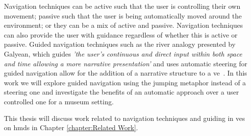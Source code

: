 Navigation techniques can be active such that the user is controlling their own movement; passive such that the user is being automatically moved around the environment; or they can be a mix of active and passive. Navigation techniques can also provide the user with guidance regardless of whether this is active or passive. Guided navigation techniques such as the river analogy presented by Galyean, which guides \textit{'the user’s continuous and direct input within both space and time allowing a more narrative presentation'} and uses automatic steering for guided navigation allow for the addition of a narrative structure to a \acrshort{ve}~\cite{Galyean1995}. In this work we will explore guided navigation using the jumping metaphor instead of a steering one and investigate the benefits of an automatic approach over a user controlled one for a museum setting. 

This thesis will discuss work related to navigation techniques and guiding in \acrshort{ve}s on \acrfull{hmd}s in Chapter \ref{chapter:Related Work}. 
